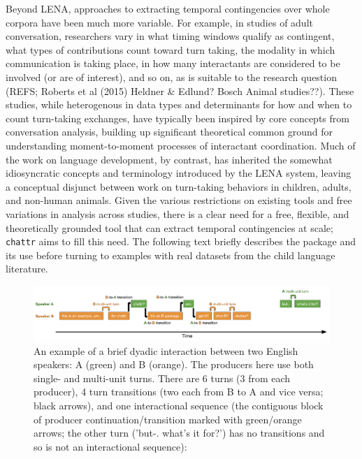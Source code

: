 \documentclass[10pt, letterpaper]{article}
\newenvironment{CodeChunk}{}{}
\begin{document}
Beyond LENA, approaches to extracting temporal contingencies over whole
corpora have been much more variable. For example, in studies of adult
conversation, researchers vary in what timing windows qualify as
contingent, what types of contributions count toward turn taking, the
modality in which communication is taking place, in how many
interactants are considered to be involved (or are of interest), and so
on, as is suitable to the research question (REFS; Roberts et al (2015)
Heldner \& Edlund? Bosch Animal studies??). These studies, while
heterogenous in data types and determinants for how and when to count
turn-taking exchanges, have typically been inspired by core concepts
from conversation analysis, building up significant theoretical common
ground for understanding moment-to-moment processes of interactant
coordination. Much of the work on language development, by contrast, has
inherited the somewhat idiosyncratic concepts and terminology introduced
by the LENA system, leaving a conceptual disjunct between work on
turn-taking behaviors in children, adults, and non-human animals. Given
the various restrictions on existing tools and free variations in
analysis across studies, there is a clear need for a free, flexible, and
theoretically grounded tool that can extract temporal contingencies at
scale; \texttt{chattr} aims to fill this need. The following text
briefly describes the package and its use before turning to examples
with real datasets from the child language literature.

\begin{CodeChunk}
\begin{figure}[h]

{\centering \includegraphics{figs/minisequence-1} 

}

\caption[An example of a brief dyadic interaction between two English speakers]{An example of a brief dyadic interaction between two English speakers: A (green) and B (orange). The producers here use both single- and multi-unit turns. There are 6 turns (3 from each producer), 4 turn transitions (two each from B to A and vice versa; black arrows), and one interactional sequence (the contiguous block of producer continuation/transition marked with green/orange arrows; the other turn ('but-. what's it for?') has no transitions and so is not an interactional sequence):}\label{fig:minisequence}
\end{figure}
\end{CodeChunk}
\end{document}
